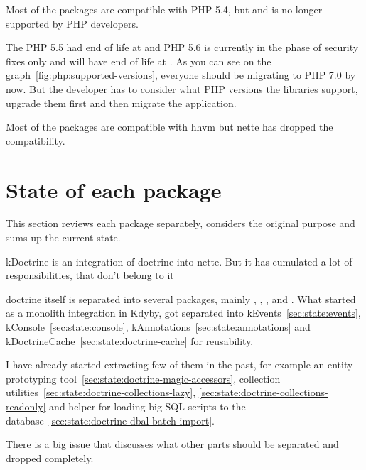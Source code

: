 Most of the packages are compatible with PHP 5.4, but  and is no longer supported by PHP developers.

The PHP 5.5 had end of life at  and PHP 5.6 is currently in the phase of security fixes only and will have end of life at . As you can see on the graph~\ref{fig:php:supported-versions}, everyone should be migrating to PHP 7.0 by now. But the developer has to consider what PHP versions the libraries support, upgrade them first and then migrate the application.

Most of the packages are compatible with \gls{hhvm} but \gls{nette} has dropped the compatibility.

\section{State of each package}

This section reviews each package separately, considers the original purpose and sums up the current state.

 \label{sec:state:doctrine}

\gls{kDoctrine} is an integration of \gls{doctrine} into \gls{nette}. But it has cumulated a lot of responsibilities, that don't belong to it

\gls{doctrine} itself is separated into several packages, mainly , , ,  and . What started as a monolith integration in Kdyby, got separated into \gls{kEvents}~\ref{sec:state:events}, \gls{kConsole}~\ref{sec:state:console}, \gls{kAnnotations}~\ref{sec:state:annotations} and \gls{kDoctrineCache}~\ref{sec:state:doctrine-cache} for reusability.

I have already started extracting few of them in the past, for example an entity prototyping tool~\ref{sec:state:doctrine-magic-accessors}, collection utilities~\ref{sec:state:doctrine-collections-lazy}, \ref{sec:state:doctrine-collections-readonly} and helper for loading big SQL scripts to the database~\ref{sec:state:doctrine-dbal-batch-import}.

There is a big issue  that discusses what other parts should be separated and dropped completely.

